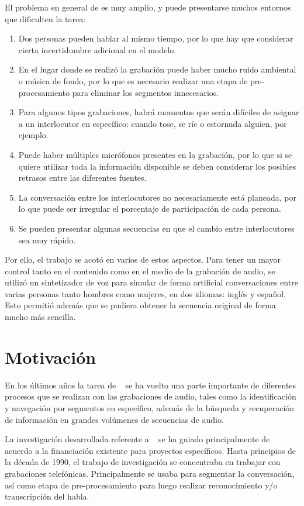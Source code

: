 El problema en general de \sd es muy amplio, y puede presentarse muchos entornos que dificulten la tarea:
\begin{enumerate}
\item Dos personas pueden hablar al mismo tiempo, por lo que hay que considerar cierta incertidumbre adicional en el modelo.
\item En el lugar donde se realizó la grabación puede haber mucho ruido ambiental o música de fondo, por lo que es necesario realizar una etapa de pre-procesamiento para eliminar los segmentos innecesarios.
\item Para algunos tipos grabaciones, habrá momentos que serán difíciles de asignar a un interlocutor en específico: cuando tose, se ríe o estornuda alguien, por ejemplo.
\item Puede haber múltiples micrófonos presentes en la grabación, por lo que si se quiere utilizar toda la información disponible se deben considerar los posibles retrasos entre las diferentes fuentes.
\item La conversación entre los interlocutores no necesariamente está planeada, por lo que puede ser irregular el porcentaje de participación de cada persona. 
\item Se pueden presentar algunas secuencias en que el cambio entre interlocutores sea muy rápido. 
\end{enumerate}

Por ello, el trabajo se acotó en varios de estos aspectos. Para tener un mayor control tanto en el contenido como en el medio de la grabación de audio, se utilizó un sintetizador de voz para simular de forma artificial conversaciones entre varias personas tanto hombres como mujeres, en dos idiomas: inglés y español. Esto permitió además que se pudiera obtener la secuencia original de forma mucho más sencilla.

\section{Motivación}
\label{sec:lemotiv}

En los últimos años la tarea de \SD~ se ha vuelto una parte importante de diferentes procesos que se realizan con las grabaciones de audio, tales como la identificación y navegación por segmentos en específico, además de la búsqueda y recuperación de información en grandes volúmenes de secuencias de audio.

La investigación desarrollada referente a \sd~ se ha guiado principalmente de acuerdo a la financiación existente para proyectos específicos. Hasta principios de la década de 1990, el trabajo de investigación se concentraba en trabajar con grabaciones telefónicas. Principalmente se usaba para segmentar la conversación, así como etapa de pre-procesamiento para luego realizar reconocimiento y/o transcripción del habla.

